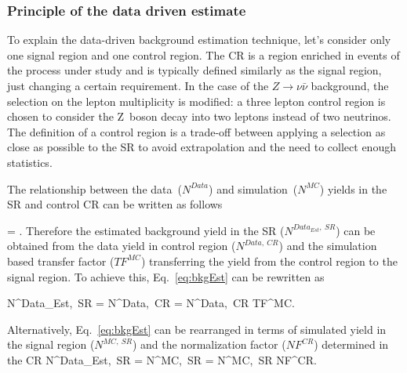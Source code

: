 \subsubsection{Principle of the data driven estimate}

To explain the data-driven background estimation technique, let's consider only one signal region and one control region. The CR is a region enriched in events of the process under study and is typically defined similarly as the signal region, just changing a certain requirement. In the case of the $Z \to \nu \bar{\nu}$ background, the selection on the lepton multiplicity is modified: a three lepton control region is chosen to consider the Z~boson decay into two leptons instead of two neutrinos. The definition of a control region is a trade-off between applying a selection as close as possible to the SR to avoid extrapolation and the need to collect enough statistics. 

The relationship between the data~($N^{Data}$) and simulation~($N^{MC}$) yields in the SR and control CR can be written as follows

{
  = .
}
Therefore the estimated background yield in the SR ($N^{Data_{Est},~SR}$) can be obtained from the data yield in control region ($N^{Data,~CR}$) and the simulation based transfer factor ($TF^{MC}$) transferring the yield from the control region to the signal region. To achieve this, Eq.~\ref{eq:bkgEst} can be rewritten as

{
N^{Data_{Est},~SR}  = N^{Data,~CR} \times  {} = N^{Data,~CR} \times  TF^{MC}.
}

Alternatively, Eq.~\ref{eq:bkgEst} can be rearranged in terms of simulated yield in the signal region ($N^{MC,~SR}$) and the normalization factor ($NF^{CR}$) determined in the CR
{
N^{Data_{Est},~SR}  = N^{MC,~SR} \times  {} = N^{MC,~SR} \times  NF^{CR}.
}

